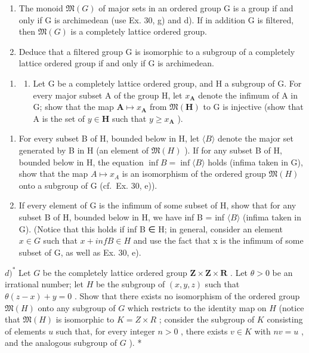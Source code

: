 \begin{enumerate}
\def\labelenumi{\alph{enumi})}
\item
  The monoid \(\mathfrak{M}(G)\) of major sets in an ordered group G is a group if and only if G is archimedean (use Ex. 30, g) and d). If in addition G is filtered, then \(\mathfrak{M}(G)\) is a completely lattice ordered group.
\item
  Deduce that a filtered group G is isomorphic to a subgroup of a completely lattice ordered group if and only if G is archimedean.
\end{enumerate}

\begin{enumerate}
\def\labelenumi{\arabic{enumi})}
\setcounter{enumi}{31}
\tightlist
\item
  \begin{enumerate}
  \def\labelenumii{\alph{enumii})}
  \tightlist
  \item
    Let G be a completely lattice ordered group, and H a subgroup of G. For every major subset A of the group H, let \(x_{\mathbf{A}}\) denote the infimum of A in G; show that the map \(\mathbf{A} \mapsto x_{\mathbf{A}}\) from \(\mathfrak{M}(\mathbf{H})\) to G is injective (show that A is the set of \(y \in \mathbf{H}\) such that \(y \geqslant x_{\mathbf{A}}\) ).
  \end{enumerate}
\end{enumerate}

\begin{enumerate}
\def\labelenumi{\alph{enumi})}
\setcounter{enumi}{1}
\item
  For every subset B of H, bounded below in H, let \(\langle B\rangle\) denote the major set generated by B in H (an element of \(\mathfrak{M}(H)\) ). If for any subset B of H, bounded below in H, the equation \(\inf B = \inf \langle B \rangle\) holds (infima taken in G), show that the map \(A \mapsto x_{A}\) is an isomorphism of the ordered group \(\mathfrak{M}(H)\) onto a subgroup of G (cf.~Ex. 30, e)).
\item
  If every element of G is the infimum of some subset of H, show that for any subset B of H, bounded below in H, we have inf B = inf \(\langle B\rangle\) (infima taken in G). (Notice that this holds if inf B ∈ H; in general, consider an element \(x \in G\) such that \(x + inf B \in H\) and use the fact that x is the infimum of some subset of G, as well as Ex. 30, e).
\end{enumerate}

\(d) ^{*}\) Let \(G\) be the completely lattice ordered group \(\mathbf{Z} \times \mathbf{Z} \times \mathbf{R}\) . Let \(\theta > 0\) be an irrational number; let \(H\) be the subgroup of \((x, y, z)\) such that \(\theta(z - x) + y = 0\) . Show that there exists no isomorphism of the ordered group \(\mathfrak{M}(H)\) onto any subgroup of \(G\) which restricts to the identity map on \(H\) (notice that \(\mathfrak{M}(H)\) is isomorphic to \(K = Z \times R\) ; consider the subgroup of \(K\) consisting of elements \(u\) such that, for every integer \(n > 0\) , there exists \(v \in K\) with \(nv = u\) , and the analogous subgroup of \(G\) ). *

